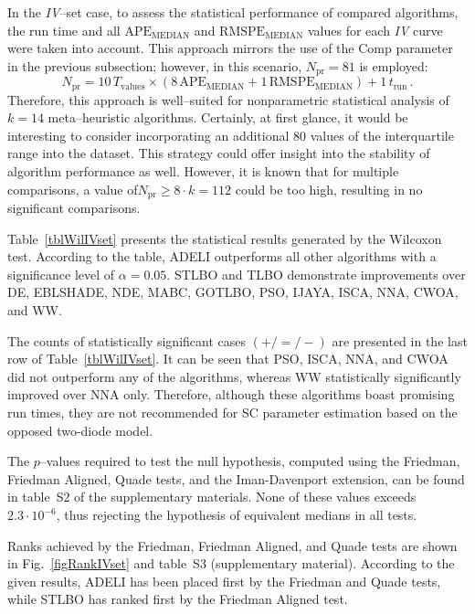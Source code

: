 \documentclass[a4paper,fleqn]{cas-sc}
\begin{document}
In the \emph{IV}--set case, to assess the statistical performance of compared algorithms,
the run time and all $\mathrm{APE}_\mathrm{MEDIAN}$ and $\mathrm{RMSPE}_\mathrm{MEDIAN}$ values
for each \emph{IV} curve were taken into account.
This approach mirrors the use of the Comp parameter in the previous subsection;
however, in this scenario, $N_\mathrm{pr}=81$ is employed:
\begin{equation*}
N_\mathrm{pr}= 10\,T_\mathrm{values}\times(8\,\mathrm{APE}_\mathrm{MEDIAN}+1\,\mathrm{RMSPE}_\mathrm{MEDIAN})+1\,t_\mathrm{run}\,.
\end{equation*}
Therefore, this approach is well--suited for nonparametric statistical analysis of $k=14$ meta--heuristic algorithms.
Certainly, at first glance, it would be interesting to consider incorporating an additional 80 values of the interquartile range into the dataset.
This strategy could offer insight into the stability of algorithm performance as well.
However, it is known \cite{Derrac2011} that for multiple comparisons,
a value of$N_\mathrm{pr}\geq 8\cdot k=112$ could be too high, resulting in no significant comparisons.


Table~\ref{tblWilIVset} presents the statistical results generated by the Wilcoxon test.
According to the table, ADELI outperforms all other algorithms with a significance level of $\alpha = 0.05$.
STLBO and TLBO demonstrate improvements over DE, EBLSHADE, NDE, MABC, GOTLBO, PSO, IJAYA, ISCA, NNA, CWOA, and WW.

The counts of statistically significant cases $(+/=/-)$ are presented in the last row of Table~\ref{tblWilIVset}.
It can be seen that PSO, ISCA, NNA, and CWOA did not outperform any of the algorithms,
whereas WW statistically significantly improved over NNA only.
Therefore, although these algorithms boast promising run times,
they are not recommended for SC parameter estimation based on the opposed two-diode model.

The $p$--values required to test the null hypothesis, computed using the
Friedman, Friedman Aligned, Quade tests, and the Iman-Davenport extension,
can be found in table~S2 of the supplementary materials.
None of these values exceeds $2.3\cdot10^{-6}$, thus rejecting the hypothesis of equivalent medians in all tests.


Ranks achieved by the Friedman, Friedman Aligned, and Quade tests are shown in Fig.~\ref{figRankIVset}
and table~S3 (supplementary material).
According to the given results, ADELI has been placed first by the Friedman and Quade tests,
while STLBO has ranked first by the Friedman Aligned test.
\end{document}
